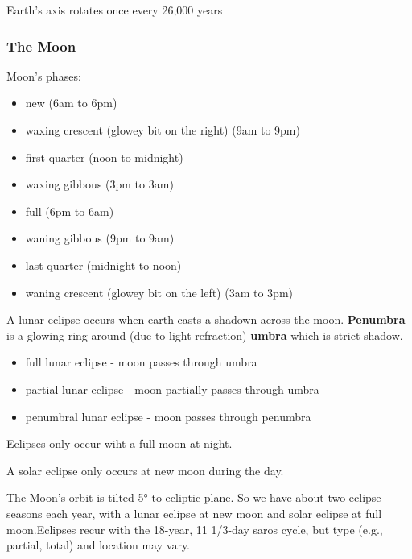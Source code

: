 \documentclass[12pt]{article}
\begin{document}
Earth's axis rotates once every 26,000 years

\subsubsection{The Moon}
Moon's phases:
\begin{itemize}
\item new (6am to 6pm)
\item waxing crescent (glowey bit on the right) (9am to 9pm)
\item first quarter (noon to midnight)
\item waxing gibbous (3pm to 3am)
\item full (6pm to 6am)
\item waning gibbous (9pm to 9am)
\item last quarter (midnight to noon)
\item waning crescent (glowey bit on the left) (3am to 3pm)
\end{itemize}

A lunar eclipse occurs when earth casts a shadown across the moon. \textbf{Penumbra} is a glowing ring around (due to light refraction) \textbf{umbra} which is strict shadow.
\begin{itemize}
\item full lunar eclipse - moon passes through umbra
\item partial lunar eclipse - moon partially passes through umbra
\item penumbral lunar eclipse - moon passes through penumbra
\end{itemize}
Eclipses only occur wiht a full moon at night.

A solar eclipse only occurs at new moon during the day.

The Moon's orbit is tilted 5° to ecliptic plane. So we have about two eclipse seasons each year, with a lunar eclipse at new moon and solar eclipse at full moon.Eclipses recur with the 18-year, 11 1/3-day saros cycle, but type (e.g., partial, total) and location may vary.
\end{document}
